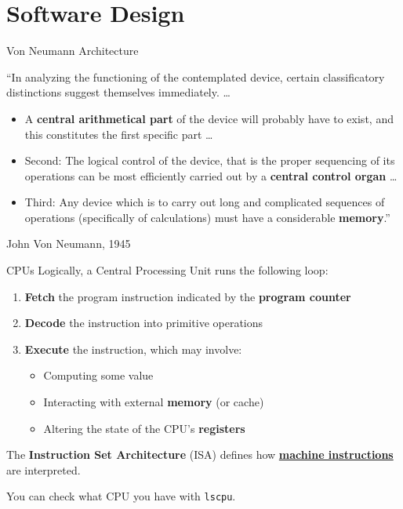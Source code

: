 \documentclass{beamer}
\newif\ifhasdiagram
\newcommand{\sectiondiagram}[1]{%
    \def\insertsdiagram{#1}%
    \hasdiagramtrue
}
\newcommand{\sectionquote}[1]{%
    \def\insertsquote{\small #1}%
}
\newcommand{\insertsdiagram}{}
\newcommand{\insertsquote}{}
\renewcommand{\insertsquote}{}
\renewcommand{\insertsdiagram}{}
\begin{document}
\sectiondiagram{software}
\sectionquote{``You don't need to be an engineer to be a racing driver, but you do need Mechanical Sympathy.'' Jackie Stewart}
\section{Software Design}

\begin{frame}{Von Neumann Architecture}
	\begin{block}{}
		``In analyzing the functioning of the contemplated device, certain classificatory distinctions suggest themselves immediately. \ldots

		\begin{itemize}
			\item A \textbf{central arithmetical part} of the device will probably have to exist, and this constitutes the first specific part \ldots

			\item Second: The logical control of the device, that is the proper sequencing of its operations can be most efficiently carried out by a \textbf{central control organ} \ldots

			\item Third: Any device which is to carry out long and complicated sequences of operations (specifically of calculations) must have a considerable \textbf{memory}.''
		\end{itemize}

		John Von Neumann, 1945
	\end{block}
\end{frame}

\begin{frame}{CPUs}
	Logically, a Central Processing Unit runs the following loop:
	\begin{enumerate}
		\item \textbf{Fetch} the program instruction indicated by the \textbf{program counter}
		\item \textbf{Decode} the instruction into primitive operations %
		\item \textbf{Execute} the instruction, which may involve:
		\begin{itemize}
			\item Computing some value
			\item Interacting with external \textbf{memory} (or cache)
			\item Altering the state of the CPU's \textbf{registers}
		\end{itemize}
	\end{enumerate}

	The \textbf{Instruction Set Architecture} (ISA) defines how \href{https://godbolt.org/z/e3q4rox9e}{\textbf{machine instructions}} are interpreted.

	You can check what CPU you have with \texttt{lscpu}.

\end{frame}
\end{document}
